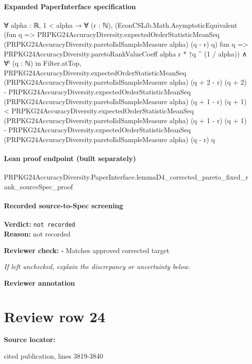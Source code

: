 \documentclass[10pt]{article}
\newcommand{\reviewerbox}{%
  \par\noindent\fbox{\parbox{0.96\linewidth}{\rule{0pt}{0.38in}}}\par
}
\newcommand{\reviewmatch}[1]{%
  \par\noindent\textbf{Reviewer check:} $\square$\; #1\par
  \noindent\emph{If left unchecked, explain the discrepancy or uncertainty below.}\par
}
\begin{document}
\paragraph{Expanded PaperInterface specification}
\begin{ReviewVerbatim}
∀ {alpha : ℝ},
  1 < alpha →
    ∀ (r : ℕ),
      (EconCSLib.Math.AsymptoticEquivalent
          (fun q =>
            PRPKG24AccuracyDiversity.expectedOrderStatisticMeanSeq
              (PRPKG24AccuracyDiversity.paretoIidSampleMeasure alpha) (q - r) q)
          fun q => PRPKG24AccuracyDiversity.paretoRankValueCoeff alpha r * ↑q ^ (1 / alpha)) ∧
        ∀ᶠ (q : ℕ) in Filter.atTop,
          PRPKG24AccuracyDiversity.expectedOrderStatisticMeanSeq (PRPKG24AccuracyDiversity.paretoIidSampleMeasure alpha)
                (q + 2 - r) (q + 2) -
              PRPKG24AccuracyDiversity.expectedOrderStatisticMeanSeq
                (PRPKG24AccuracyDiversity.paretoIidSampleMeasure alpha) (q + 1 - r) (q + 1) <
            PRPKG24AccuracyDiversity.expectedOrderStatisticMeanSeq
                (PRPKG24AccuracyDiversity.paretoIidSampleMeasure alpha) (q + 1 - r) (q + 1) -
              PRPKG24AccuracyDiversity.expectedOrderStatisticMeanSeq
                (PRPKG24AccuracyDiversity.paretoIidSampleMeasure alpha) (q - r) q
\end{ReviewVerbatim}

\paragraph{Lean proof endpoint (built separately)}\begin{ReviewVerbatim}
PRPKG24AccuracyDiversity.PaperInterface.lemmaD4_corrected_pareto_fixed_rank_sourceSpec_proof
\end{ReviewVerbatim}

\paragraph{Recorded source-to-Spec screening}
\textbf{Verdict:} \texttt{not recorded}
\\
\textbf{Reason:} not recorded
\reviewmatch{Matches approved corrected target}
\noindent\textbf{Reviewer annotation}\par
\reviewerbox
\clearpage
\hypertarget{source-claim-477ea495052a0969}{}
\section*{Review row 24}
\textbf{Source locator:} {\footnotesize\raggedright cited publication, lines 3819-\allowbreak{}3840\par}
\end{document}
